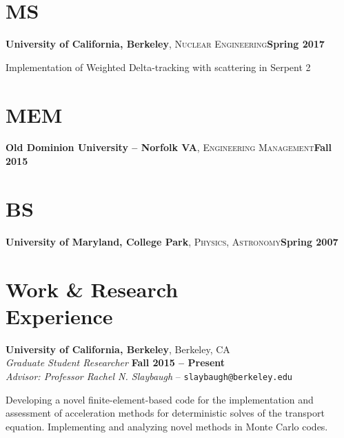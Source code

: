 \documentclass[margin,line]{resume}
\begin{document}
\begin{resume}
    \section{\mysidestyle MS}
    \textbf{University of California, Berkeley}, \textsc{Nuclear
      Engineering}\hfill\textbf{Spring 2017}\vspace{-3mm}\\\vspace{-1mm}%
    \begin{list2}
        \item[] Implementation of Weighted Delta-tracking with
          scattering in Serpent 2
        \end{list2}\vspace{-1.5mm}
    \section{\mysidestyle MEM}
    \textbf{Old Dominion University -- Norfolk VA},
    \textsc{Engineering Management}\hfill\textbf{Fall 2015}\vspace{-3mm}\\\vspace{-1mm}%
    \section{\mysidestyle BS}
    \textbf{University of Maryland, College Park},
    \textsc{Physics, Astronomy}\hfill\textbf{Spring 2007}\vspace{-3mm}\\\vspace{-1mm}%
\vspace{-1.5mm}
    \section{\mysidestyle Work \& Research \\Experience}
    \textbf{University of California, Berkeley}, Berkeley, CA\\
                \textsl{Graduate Student Researcher} \hfill
                \textbf{Fall 2015 -- Present}\\
                \textsl{Advisor: Professor Rachel N. Slaybaugh} -- \verb`slaybaugh@berkeley.edu`
                \begin{list2}
                \item[]                 Developing a novel finite-element-based code for the implementation and
                assessment of acceleration methods for deterministic
                solves of the transport
                equation. Implementing and analyzing novel methods in
                Monte Carlo codes.


\end{list2}
\end{resume}
\end{document}

